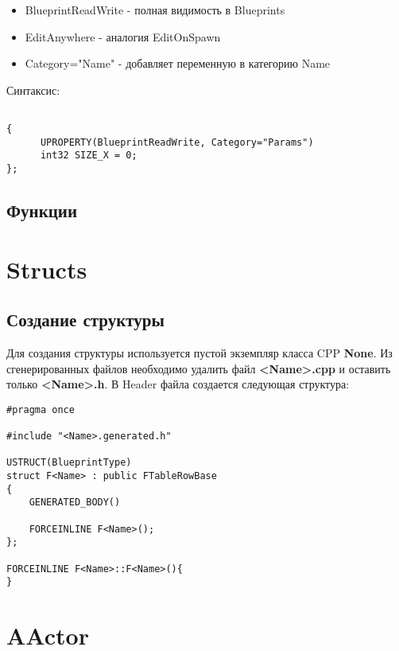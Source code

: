 \documentclass[a4paper,article,14pt]{extarticle}
\begin{document}
\begin{itemize}
\item{BlueprintReadWrite - полная видимость в Blueprints}
\item{EditAnywhere - аналогия EditOnSpawn}
\item{Category="Name" \- - добавляет переменную в категорию Name}
\end{itemize}

Синтаксис:

\begin{lstlisting}           

{
      UPROPERTY(BlueprintReadWrite, Category="Params")
      int32 SIZE_X = 0;
};

\end{lstlisting}          

\subsection{Функции}



\newpage
\section{Structs}
\subsection{Создание структуры}

Для создания структуры используется пустой экземпляр класса CPP \textbf{None}. Из сгенерированных файлов необходимо удалить файл \textbf{<Name>.cpp} и оставить только \textbf{<Name>.h}. В Header файла создается следующая структура:
\\
\lstset{language=C}          
\begin{lstlisting}           
#pragma once

#include "<Name>.generated.h"

USTRUCT(BlueprintType)
struct F<Name> : public FTableRowBase
{
	GENERATED_BODY()
    
	FORCEINLINE F<Name>();
};

FORCEINLINE F<Name>::F<Name>(){
}
\end{lstlisting}          

\newpage
\section{AActor}
\end{document}
